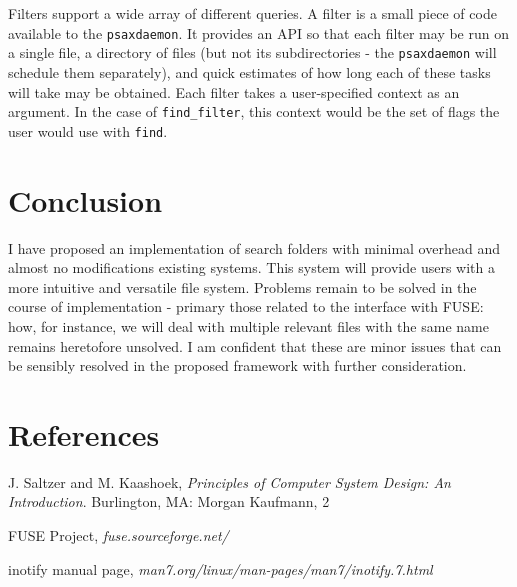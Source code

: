 \documentclass[a4paper]{report}
\newcommand{\inlinecode}{\texttt}
\begin{document}
Filters support a wide array of different queries. A filter is a small piece of code available to the \inlinecode{psaxdaemon}. It provides an API so that each filter may be run on a single file, a directory of files (but not its subdirectories - the \inlinecode{psaxdaemon} will schedule them separately), and quick estimates of how long each of these tasks will take may be obtained. Each filter takes a user-specified context as an argument. In the case of \inlinecode{find\_filter}, this context would be the set of flags the user would use with \inlinecode{find}.

\section{Conclusion}

I have proposed an implementation of search folders with minimal overhead and almost no modifications existing systems. This system will provide users with a more intuitive and versatile file system. Problems remain to be solved in the course of implementation - primary those related to the interface with FUSE: how, for instance, we will deal with multiple relevant files with the same name remains heretofore unsolved. I am confident that these are minor issues that can be sensibly resolved in the proposed framework with further consideration.

\section{References}

J. Saltzer  and  M. Kaashoek,  \textit{Principles  of  Computer  System  Design:  An  Introduction}.
Burlington,  MA:  Morgan  Kaufmann,  2

FUSE Project, \textit{fuse.sourceforge.net/}

inotify manual page, \textit{man7.org/linux/man-pages/man7/inotify.7.html}
\end{document}
